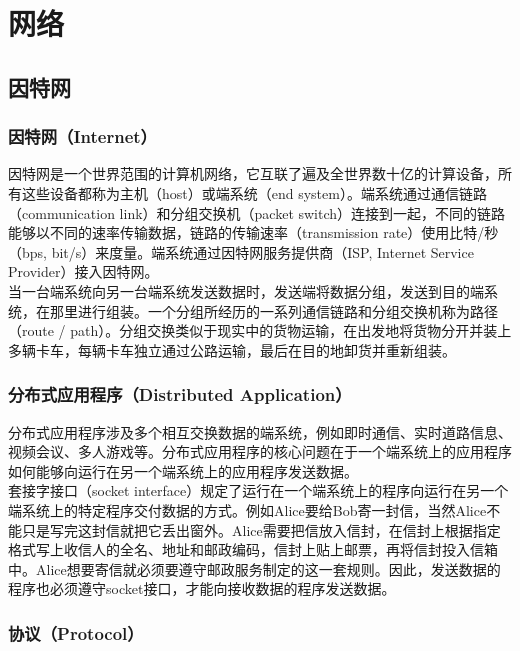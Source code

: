 \chapter{网络}

\section{因特网}

\subsection{因特网（Internet）}

因特网是一个世界范围的计算机网络，它互联了遍及全世界数十亿的计算设备，所有这些设备都称为主机（host）或端系统（end system）。端系统通过通信链路（communication link）和分组交换机（packet switch）连接到一起，不同的链路能够以不同的速率传输数据，链路的传输速率（transmission rate）使用比特/秒（bps, bit/s）来度量。端系统通过因特网服务提供商（ISP, Internet Service Provider）接入因特网。\\

当一台端系统向另一台端系统发送数据时，发送端将数据分组，发送到目的端系统，在那里进行组装。一个分组所经历的一系列通信链路和分组交换机称为路径（route / path）。分组交换类似于现实中的货物运输，在出发地将货物分开并装上多辆卡车，每辆卡车独立通过公路运输，最后在目的地卸货并重新组装。\\

\subsection{分布式应用程序（Distributed Application）}

分布式应用程序涉及多个相互交换数据的端系统，例如即时通信、实时道路信息、视频会议、多人游戏等。分布式应用程序的核心问题在于一个端系统上的应用程序如何能够向运行在另一个端系统上的应用程序发送数据。\\

套接字接口（socket interface）规定了运行在一个端系统上的程序向运行在另一个端系统上的特定程序交付数据的方式。例如Alice要给Bob寄一封信，当然Alice不能只是写完这封信就把它丢出窗外。Alice需要把信放入信封，在信封上根据指定格式写上收信人的全名、地址和邮政编码，信封上贴上邮票，再将信封投入信箱中。Alice想要寄信就必须要遵守邮政服务制定的这一套规则。因此，发送数据的程序也必须遵守socket接口，才能向接收数据的程序发送数据。\\

\subsection{协议（Protocol）}


